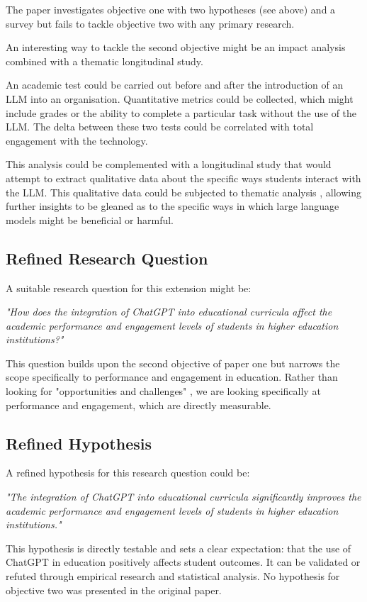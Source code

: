 \documentclass[12pt]{article}
\begin{document}
The paper investigates objective one with two hypotheses (see above) and a survey but fails to tackle objective two with any primary research.

An interesting way to tackle the second objective might be an impact analysis combined with a thematic longitudinal study. 

An academic test could be carried out before and after the introduction of an LLM into an organisation. Quantitative metrics could be collected, which might include grades or the ability to complete a particular task without the use of the LLM. The delta between these two tests could be correlated with total engagement with the technology.

This analysis could be complemented with a longitudinal study that would attempt to extract qualitative data about the specific ways students interact with the LLM. This qualitative data could be subjected to thematic analysis \cite{taguette}, allowing further insights to be gleaned as to the specific ways in which large language models might be beneficial or harmful.

\subsection{Refined Research Question}

A suitable research question for this extension might be:

\textit{"How does the integration of ChatGPT into educational curricula affect the academic performance and engagement levels of students in higher education institutions?"}

This question builds upon the second objective of paper one but narrows the scope specifically to performance and engagement in education. Rather than looking for "opportunities and challenges" \cite{paper1}, we are looking specifically at performance and engagement, which are directly measurable.

\subsection{Refined Hypothesis}

A refined hypothesis for this research question could be:

\textit{"The integration of ChatGPT into educational curricula significantly improves the academic performance and engagement levels of students in higher education institutions."}

This hypothesis is directly testable and sets a clear expectation: that the use of ChatGPT in education positively affects student outcomes. It can be validated or refuted through empirical research and statistical analysis. No hypothesis for objective two was presented in the original paper.
\end{document}
